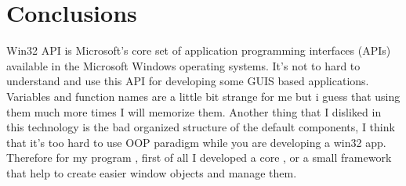 \section*{Conclusions}

Win32 API is Microsoft's core set of application programming interfaces (APIs) available in the Microsoft Windows operating systems. It's not to hard to understand and use this API for developing some GUIS based applications. Variables and function names are a little bit strange for me but i guess that using them much more times I will memorize them. Another thing that I disliked in this technology is the bad organized structure of the default components, I think that it's too hard to use OOP paradigm while you are developing a win32 app. Therefore for my program , first of all I developed a core , or a small framework that help to create easier window objects and manage them.

\clearpage